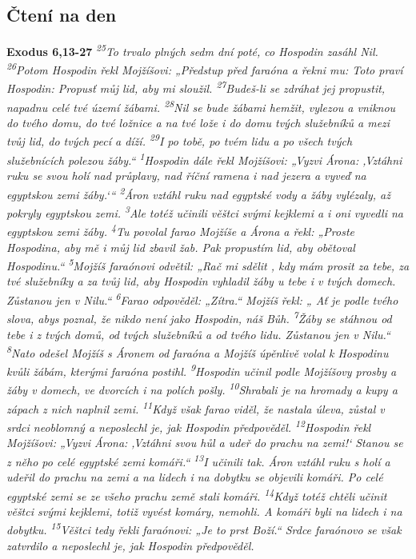 \documentclass[11pt]{article}
\begin{document}
\subsection*{Čtení na den}
\textbf{Exodus 6,13-27}
\newline
\textit{ 
\textsuperscript{25}To trvalo plných sedm dní poté, co Hospodin zasáhl Nil.
\textsuperscript{26}Potom Hospodin řekl Mojžíšovi: „Předstup před faraóna a řekni mu: Toto praví Hospodin: Propusť můj lid, aby mi sloužil.
\textsuperscript{27}Budeš-li se zdráhat jej propustit, napadnu celé tvé území žábami.
\textsuperscript{28}Nil se bude žábami hemžit, vylezou a vniknou do tvého domu, do tvé ložnice a na tvé lože i do domu tvých služebníků a mezi tvůj lid, do tvých pecí a díží.
\textsuperscript{29}I po tobě, po tvém lidu a po všech tvých služebnících polezou žáby.“
\textsuperscript{1}Hospodin dále řekl Mojžíšovi: „Vyzvi Árona: ‚Vztáhni ruku se svou holí nad průplavy, nad říční ramena i nad jezera a vyveď na egyptskou zemi žáby.‘“
\textsuperscript{2}Áron vztáhl ruku nad egyptské vody a žáby vylézaly, až pokryly egyptskou zemi.
\textsuperscript{3}Ale totéž učinili věštci svými kejklemi a i oni vyvedli na egyptskou zemi žáby.
\textsuperscript{4}Tu povolal farao Mojžíše a Árona a řekl: „Proste Hospodina, aby mě i můj lid zbavil žab. Pak propustím lid, aby obětoval Hospodinu.“
\textsuperscript{5}Mojžíš faraónovi odvětil: „Rač mi sdělit , kdy mám prosit za tebe, za tvé služebníky a za tvůj lid, aby Hospodin vyhladil žáby u tebe i v tvých domech. Zůstanou jen v Nilu.“
\textsuperscript{6}Farao odpověděl: „Zítra.“ Mojžíš řekl: „ Ať je podle tvého slova, abys poznal, že nikdo není jako Hospodin, náš Bůh.
\textsuperscript{7}Žáby se stáhnou od tebe i z tvých domů, od tvých služebníků a od tvého lidu. Zůstanou jen v Nilu.“
\textsuperscript{8}Nato odešel Mojžíš s Áronem od faraóna a Mojžíš úpěnlivě volal k Hospodinu kvůli žábám, kterými faraóna postihl.
\textsuperscript{9}Hospodin učinil podle Mojžíšovy prosby a žáby v domech, ve dvorcích i na polích pošly.
\textsuperscript{10}Shrabali je na hromady a kupy a zápach z nich naplnil zemi.
\textsuperscript{11}Když však farao viděl, že nastala úleva, zůstal v srdci neoblomný a neposlechl je, jak Hospodin předpověděl.
\textsuperscript{12}Hospodin řekl Mojžíšovi: „Vyzvi Árona: ‚Vztáhni svou hůl a udeř do prachu na zemi!‘ Stanou se z něho po celé egyptské zemi komáři.“
\textsuperscript{13}I učinili tak. Áron vztáhl ruku s holí a udeřil do prachu na zemi a na lidech i na dobytku se objevili komáři. Po celé egyptské zemi se ze všeho prachu země stali komáři.
\textsuperscript{14}Když totéž chtěli učinit věštci svými kejklemi, totiž vyvést komáry, nemohli. A komáři byli na lidech i na dobytku.
\textsuperscript{15}Věštci tedy řekli faraónovi: „Je to prst Boží.“ Srdce faraónovo se však zatvrdilo a neposlechl je, jak Hospodin předpověděl.
 }
\end{document}
